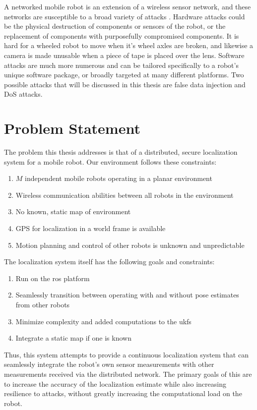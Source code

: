 \documentclass[thesis.tex]{subfile}
\begin{document}
A networked mobile robot is an extension of a wireless sensor network, and these networks are susceptible to a broad variety of attacks \cite{perrig2004security}. Hardware attacks could be the physical destruction of components or sensors of the robot, or the replacement of components with purposefully compromised components. It is hard for a wheeled robot to move when it's wheel axles are broken, and likewise a camera is made unusable when a piece of tape is placed over the lens. Software attacks are much more numerous and can be tailored specifically to a robot's unique software package, or broadly targeted at many different platforms. Two possible attacks that will be discussed in this thesis are false data injection and \gls{DoS} attacks.

\section{Problem Statement} \label{Problem Statement}
The problem this thesis addresses is that of a distributed, secure localization system for a mobile robot. Our environment follows these constraints:
\begin{enumerate}
\item $M$ independent mobile robots operating in a planar environment
\item Wireless communication abilities between all robots in the environment
\item No known, static map of environment
\item GPS for localization in a world frame is available
\item Motion planning and control of other robots is unknown and unpredictable
\end{enumerate}

The localization system itself has the following goals and constraints:
\begin{enumerate}
\item Run on the \gls{ros} platform
\item Seamlessly transition between operating with and without pose estimates from other robots
\item Minimize complexity and added computations to the \glspl{ukf}
\item Integrate a static map if one is known
\end{enumerate}

Thus, this system attempts to provide a continuous localization system that can seamlessly integrate the robot's own sensor measurements with other measurements received via the distributed network. The primary goals of this are to increase the accuracy of the localization estimate while also increasing resilience to attacks, without greatly increasing the computational load on the robot.
\end{document}
